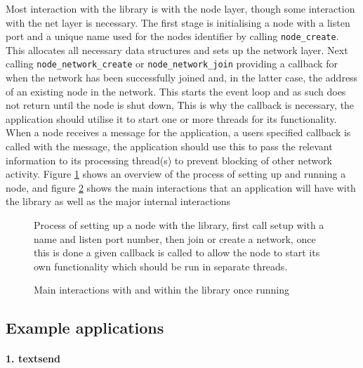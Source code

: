 \documentclass{article}
\begin{document}
Most interaction with the library is with the node layer, though some interaction with the net layer is necessary.
The first stage is initialising a node with a listen port and a unique name used for the nodes identifier by calling \texttt{node\_create}. This allocates all necessary data structures and sets up the network layer.
Next calling \texttt{node\_network\_create} or \texttt{node\_network\_join} providing a callback for when the network has been successfully joined and, in the latter case, the address of an existing node in the network.
This starts the event loop and as such does not return until the node is shut down, This is why the callback is necessary, the application should utilise it to start one or more threads for its functionality.
When a node receives a message for the application, a users specified callback is called with the message, the application should use this to pass the relevant information to its processing thread(s) to prevent blocking of other network activity.
Figure \ref{fig:startlib} shows an overview of the process of setting up and running a node, and figure \ref{fig:runlib} shows the main interactions that an application will have with the library as well as the major internal interactions

\begin{figure}
\centering
\def\svgwidth{\columnwidth}

\caption{Process of setting up a node with the library, first call setup with a name and listen port number, then join or create a network, once this is done a given callback is called to allow the node to start its own functionality which should be run in separate threads.}
\label{fig:startlib}
\end{figure}


\begin{figure}
\centering
\def\svgwidth{1.4\columnwidth}
\begin{scriptsize}
\makebox[\columnwidth][c]{}
\end{scriptsize}
\caption{Main interactions with and within the library once running }
\label{fig:runlib}
\end{figure}

\subsection{Example applications}

\paragraph{1. textsend}
\end{document}
